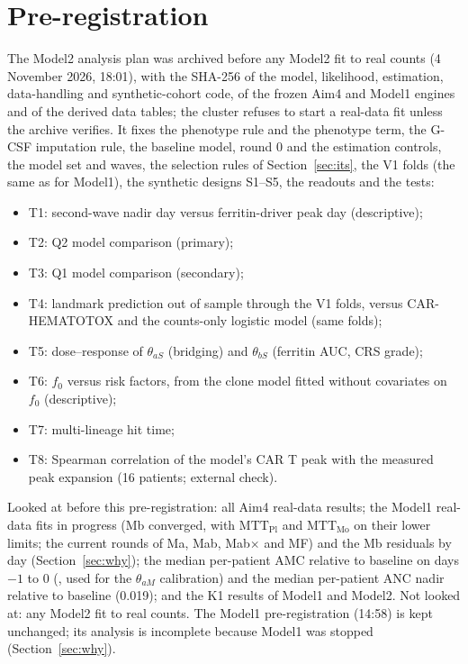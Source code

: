 \documentclass[11pt]{article}
\begin{document}




\section{Pre-registration}\label{sec:prereg}
The Model2 analysis plan was archived before any Model2 fit to real counts (4 November 2026, 18:01), with the SHA-256 of the model, likelihood, estimation, data-handling and synthetic-cohort code, of the frozen Aim4 and Model1 engines and of the derived data tables; the cluster refuses to start a real-data fit unless the archive verifies. It fixes the phenotype rule and the phenotype term, the G-CSF imputation rule, the baseline model, round 0 and the estimation controls, the model set and waves, the selection rules of Section~\ref{sec:its}, the V1 folds (the same as for Model1), the synthetic designs S1--S5, the readouts and the tests:
\begin{itemize}
\item T1: second-wave nadir day versus ferritin-driver peak day (descriptive);
\item T2: Q2 model comparison (primary);
\item T3: Q1 model comparison (secondary);
\item T4: landmark prediction out of sample through the V1 folds, versus CAR-HEMATOTOX and the counts-only logistic model (same folds);
\item T5: dose--response of $\theta_{aS}$ (bridging) and $\theta_{bS}$ (ferritin AUC, CRS grade);
\item T6: $f_0$ versus risk factors, from the clone model fitted without covariates on $f_0$ (descriptive);
\item T7: multi-lineage hit time;
\item T8: Spearman correlation of the model's CAR T peak with the measured peak expansion (16 patients; external check).
\end{itemize}
Looked at before this pre-registration: all Aim4 real-data results; the Model1 real-data fits in progress (Mb converged, with $\mathrm{MTT}_{\mathrm{Pl}}$ and $\mathrm{MTT}_{\mathrm{Mo}}$ on their lower limits; the current rounds of Ma, Mab, Mab$\times$ and MF) and the Mb residuals by day (Section~\ref{sec:why}); the median per-patient AMC relative to baseline on days $-1$ to 0 (\valAmcTarget, used for the $\theta_{aM}$ calibration) and the median per-patient ANC nadir relative to baseline (0.019); and the K1 results of Model1 and Model2. Not looked at: any Model2 fit to real counts. The Model1 pre-registration (14:58) is kept unchanged; its analysis is incomplete because Model1 was stopped (Section~\ref{sec:why}).
\end{document}
